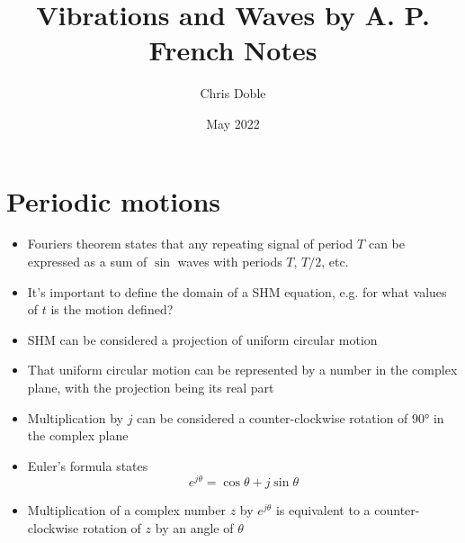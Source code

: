\documentclass{article}
\title{Vibrations and Waves by A. P. French Notes}
\author{Chris Doble}
\date{May 2022}
\begin{document}
\maketitle

\tableofcontents

\section{Periodic motions}

\begin{itemize}
  \item Fouriers theorem states that any repeating signal of period $T$ can be expressed as a sum of $\sin$ waves with periods $T$, $T / 2$, etc.

  \item It's important to define the domain of a SHM equation, e.g. for what values of $t$ is the motion defined?

  \item SHM can be considered a projection of uniform circular motion

  \item That uniform circular motion can be represented by a number in the complex plane, with the projection being its real part

  \item Multiplication by $j$ can be considered a counter-clockwise rotation of $\ang{90}$ in the complex plane

  \item Euler's formula states \[e^{j \theta} = \cos \theta + j \sin \theta\]

  \item Multiplication of a complex number $z$ by $e^{j \theta}$ is equivalent to a counter-clockwise rotation of $z$ by an angle of $\theta$
\end{itemize}
\end{document}
